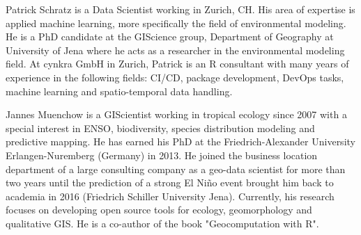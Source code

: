 \documentclass[letterpaper, peerreview, draftcls]{IEEEtran}
\begin{document}
\pagebreak




\pagebreak

\begin{IEEEbiography}
	{Patrick Schratz}
	is a Data Scientist working in Zurich, CH.
	His area of expertise is applied machine learning, more specifically the field of environmental modeling.
	He is a PhD candidate at the GIScience group, Department of Geography at University of Jena where he acts as a researcher in the environmental modeling field.
	At cynkra GmbH in Zurich, Patrick is an R consultant with many years of experience in the following fields: CI/CD, package development, DevOps tasks, machine learning and spatio-temporal data handling.
\end{IEEEbiography}
\begin{IEEEbiography}
	{Jannes Muenchow}
	is a GIScientist working in tropical ecology since 2007 with a special interest in ENSO, biodiversity, species distribution modeling and predictive mapping.
	He has earned his PhD at the Friedrich-Alexander University Erlangen-Nuremberg (Germany) in 2013.
	He joined the business location department of a large consulting company as a geo-data scientist for more than two years until the prediction of a strong El Niño event brought him back to academia in 2016 (Friedrich Schiller University Jena).
	Currently, his research focuses on developing open source tools for ecology, geomorphology and qualitative GIS.
	He is a co-author of the book "Geocomputation with R".
\end{IEEEbiography}
\end{document}
